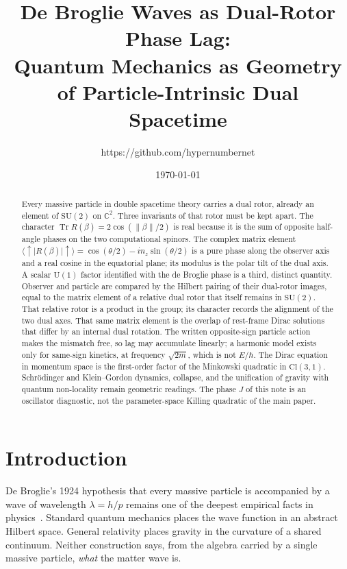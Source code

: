 \documentclass[a4paper]{article}
\title{De Broglie Waves as Dual-Rotor Phase Lag:\\ Quantum Mechanics as Geometry of Particle-Intrinsic Dual Spacetime}
\author{https://github.com/hypernumbernet}
\date{\today}
\begin{document}
\maketitle

\begin{abstract}
Every massive particle in double spacetime theory carries a dual rotor, already an element of \(\mathrm{SU}(2)\) on \(\mathbb{C}^2\). Three invariants of that rotor must be kept apart. The character \(\operatorname{Tr} R(\beta)=2\cos(\lVert\beta\rVert/2)\) is real because it is the sum of opposite half-angle phases on the two computational spinors. The complex matrix element \(\langle\uparrow\rvert R(\beta)\lvert\uparrow\rangle=\cos(\theta/2)-i n_z\sin(\theta/2)\) is a pure phase along the observer axis and a real cosine in the equatorial plane; its modulus is the polar tilt of the dual axis. A scalar \(\mathrm{U}(1)\) factor identified with the de Broglie phase is a third, distinct quantity. Observer and particle are compared by the Hilbert pairing of their dual-rotor images, equal to the matrix element of a relative dual rotor that itself remains in \(\mathrm{SU}(2)\). That relative rotor is a product in the group; its character records the alignment of the two dual axes. That same matrix element is the overlap of rest-frame Dirac solutions that differ by an internal dual rotation. The written opposite-sign particle action makes the mismatch free, so lag may accumulate linearly; a harmonic model exists only for same-sign kinetics, at frequency \(\sqrt{2m}\), which is not \(E/\hbar\). The Dirac equation in momentum space is the first-order factor of the Minkowski quadratic in \(\mathrm{Cl}(3,1)\). Schr\"odinger and Klein--Gordon dynamics, collapse, and the unification of gravity with quantum non-locality remain geometric readings. The phase \(J\) of this note is an oscillator diagnostic, not the parameter-space Killing quadratic of the main paper.
\end{abstract}

\section{Introduction}

De Broglie's 1924 hypothesis that every massive particle is accompanied by a wave of wavelength \(\lambda=h/p\) remains one of the deepest empirical facts in physics~\cite{debroglie1924}. Standard quantum mechanics places the wave function in an abstract Hilbert space. General relativity places gravity in the curvature of a shared continuum. Neither construction says, from the algebra carried by a single massive particle, \emph{what} the matter wave is.
\end{document}
